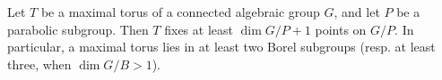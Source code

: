 Let $T$ be a maximal torus of a connected algebraic group $G$, and let $P$ be a parabolic subgroup. Then $T$ fixes at least $\dim G/P + 1$ points on $G/P$. In particular, a maximal torus lies in at least two Borel subgroups (resp. at least three, when $\dim G/B > 1$).
